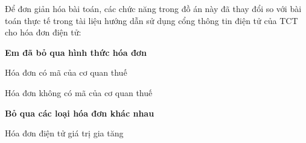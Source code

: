 Để đơn giản hóa bài toán, các chức năng trong đồ án này đã thay đổi so với bài toán thực tế trong tài liệu hướng dẫn sử dụng cổng thông tin điện tử của TCT cho hóa đơn điện tử:



















\textbf{Em đã bỏ qua hình thức hóa đơn}



















Hóa đơn có mã của cơ quan thuế



















Hóa đơn không có mã của cơ quan thuế



















\textbf{Bỏ qua các loại hóa đơn khác nhau}



















Hóa đơn điện tử giá trị gia tăng



















